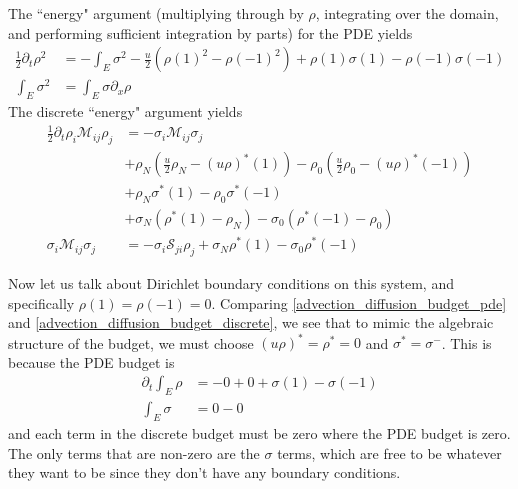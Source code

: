 \documentclass{report}
\numberwithin{equation}{section}
\begin{document}
The ``energy" argument (multiplying through by $\rho$, integrating over the domain, and performing sufficient integration by parts) for the PDE yields 
\begin{align}
\label{pde_energy_advection_diffusion}
    \frac{1}{2} \partial_t \rho^2 &= - \int_E \sigma^2 - \frac{u}{2}\left( \rho(1)^2 - \rho(-1)^2  \right) 
    + \rho(1) \sigma(1) - \rho(-1) \sigma(-1)
    \\
    \int_E \sigma^2 &= \int_E \sigma \partial_x \rho
\end{align}
The discrete ``energy" argument yields
\begin{align}
\label{discrete_energy_advection_diffusion}
\nonumber
    \frac{1}{2} \partial_t \rho_i \mathcal{M}_{ij} \rho_j &= - \sigma_i \mathcal{M}_{ij} \sigma_j 
    \\
    \nonumber
    &+ \rho_N \left(\frac{u}{2}\rho_N - (u \rho)^*(1) \right) - \rho_0 \left(\frac{u}{2} \rho_0   - (u \rho)^*(-1) \right)
    \\
    \nonumber
    &+ \rho_N \sigma^*(1) - \rho_0 \sigma^*(-1)
    \\
    &+ \sigma_N ( \rho^*(1) - \rho_N) - \sigma_0 \left( \rho^*(-1) - \rho_0 \right)
    \\
    \sigma_i \mathcal{M}_{ij} \sigma_j &= - \sigma_i \mathcal{S}_{ji} \rho_j     + \sigma_N \rho^*(1) 
    -
    \sigma_0 \rho^*(-1)
\end{align}

Now let us talk about Dirichlet boundary conditions on this system, and specifically $\rho(1) = \rho(-1) = 0$. Comparing \ref{advection_diffusion_budget_pde} and \ref{advection_diffusion_budget_discrete}, we see that to mimic the algebraic structure of the budget, we must choose $(u\rho)^* = \rho^* = 0$ and $\sigma^* = \sigma^-$. This is because the PDE budget is 
\begin{align}
\label{explicit_advection_diffusion_budget_pde}
    \partial_t \int_E \rho 
    &= -0 + 0 +  \sigma(1) - \sigma(-1)
    \\
    \int_E \sigma &= 0 - 0
\end{align}
and each term in the discrete budget must be zero where the PDE budget is zero. The only terms that are non-zero are the $\sigma$ terms, which are free to be whatever they want to be since they don't have any boundary conditions. 
\end{document}
